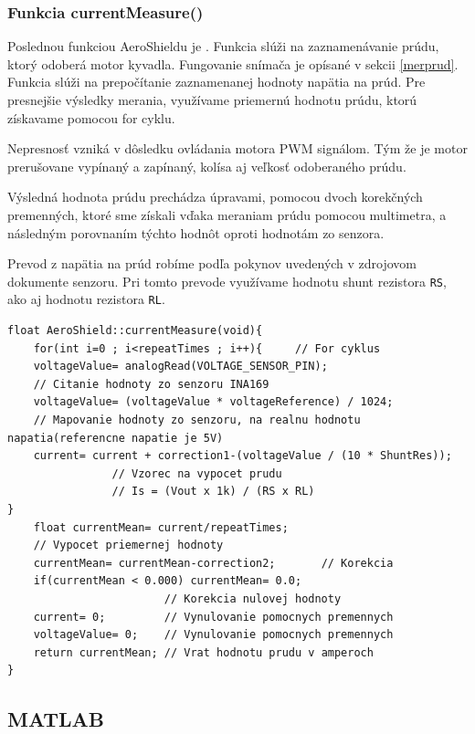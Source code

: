 	
\subsubsection{Funkcia currentMeasure()}	
	
Poslednou funkciou AeroShieldu je . Funkcia slúži na zaznamenávanie prúdu, ktorý odoberá motor kyvadla. Fungovanie snímača je opísané v sekcii \ref{merprud}. Funkcia slúži na prepočítanie zaznamenanej hodnoty napätia na prúd. Pre presnejšie výsledky merania, využívame priemernú hodnotu prúdu, ktorú získavame pomocou for cyklu. 

Nepresnosť vzniká v dôsledku ovládania motora PWM signálom. Tým že je motor prerušovane vypínaný a zapínaný, kolísa aj veľkosť odoberaného prúdu. 

Výsledná hodnota prúdu prechádza úpravami, pomocou dvoch korekčných premenných, ktoré sme získali vďaka meraniam prúdu pomocou multimetra, a následným porovnaním týchto hodnôt oproti hodnotám zo senzora. 

Prevod z napätia na prúd robíme podľa pokynov uvedených v zdrojovom dokumente senzoru. Pri tomto prevode využívame hodnotu shunt rezistora \verb|RS|, ako aj hodnotu rezistora \verb|RL|. 
  
	
\begin{lstlisting}[caption={Zdrojový kód funkcie currentMeasure.},captionpos=b]	
float AeroShield::currentMeasure(void){  
	for(int i=0 ; i<repeatTimes ; i++){     // For cyklus
	voltageValue= analogRead(VOLTAGE_SENSOR_PIN);     
	// Citanie hodnoty zo senzoru INA169 
	voltageValue= (voltageValue * voltageReference) / 1024;    
	// Mapovanie hodnoty zo senzoru, na realnu hodnotu napatia(referencne napatie je 5V)
	current= current + correction1-(voltageValue / (10 * ShuntRes));    
                // Vzorec na vypocet prudu
                // Is = (Vout x 1k) / (RS x RL)
}                                                                         	
	float currentMean= current/repeatTimes;   
	// Vypocet priemernej hodnoty  
	currentMean= currentMean-correction2;       // Korekcia
	if(currentMean < 0.000) currentMean= 0.0;                 
	                    // Korekcia nulovej hodnoty
	current= 0;         // Vynulovanie pomocnych premennych   
	voltageValue= 0;    // Vynulovanie pomocnych premennych   
	return currentMean; // Vrat hodnotu prudu v amperoch
}
\end{lstlisting}
	
\subsection{MATLAB}	
\label{matlabik}
	
